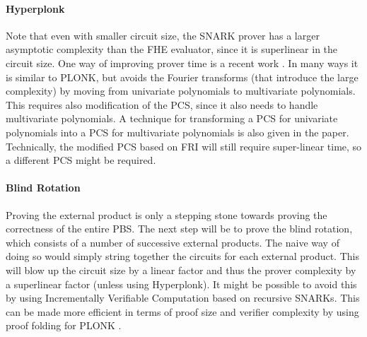 \documentclass{zamarep}
\begin{document}
\paragraph{Hyperplonk}
Note that even with smaller circuit size, the SNARK prover has a larger asymptotic complexity than the FHE evaluator, since it is superlinear in the circuit size. One way of improving prover time is a recent work \cite{EPRINT:CBBZ22}. In many ways it is similar to PLONK, but avoids the Fourier transforms (that introduce the large complexity) by moving from univariate polynomials to multivariate polynomials. This requires also modification of the PCS, since it also needs to handle multivariate polynomials. A technique for transforming a PCS for univariate polynomials into a PCS for multivariate polynomials is also given in the paper. Technically, the modified PCS based on FRI will still require super-linear time, so a different PCS might be required. 

\paragraph{Blind Rotation}
Proving the external product is only a stepping stone towards proving the correctness of the entire PBS. The next step will be to prove the blind rotation, which consists of a number of successive external products. The naive way of doing so would simply string together the circuits for each external product. This will blow up the circuit size by a linear factor and thus the prover complexity by a superlinear factor (unless using Hyperplonk). It might be possible to avoid this by using Incrementally Verifiable Computation \cite{TCC:Valiant08} based on recursive SNARKs. This can be made more efficient in terms of proof size and verifier complexity by using proof folding for PLONK \cite{sangria}.



\end{document}
